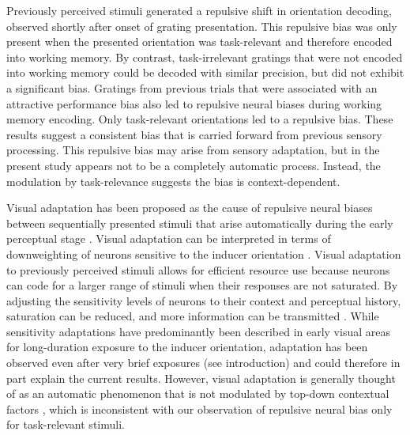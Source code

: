 \documentclass{article}
\begin{document}
\begin{large}
Previously perceived stimuli generated a repulsive shift in orientation decoding, observed shortly after onset of grating presentation. This repulsive bias was only present when the presented orientation was task-relevant and therefore encoded into working memory. By contrast, task-irrelevant gratings that were not encoded into working memory could be decoded with similar precision, but did not exhibit a significant bias. Gratings from previous trials that were associated with an attractive performance bias also led to repulsive neural biases during working memory encoding. Only task-relevant orientations led to a repulsive bias. These results suggest a consistent bias that is carried forward from previous sensory processing. This repulsive bias may arise from sensory adaptation, but in the present study appears not to be a completely automatic process. Instead, the modulation by task-relevance suggests the bias is context-dependent. 

Visual adaptation has been proposed as the cause of repulsive neural biases between sequentially presented stimuli that arise automatically during the early perceptual stage \parencite{Jazayeri2006, Jazayeri2007, Stocker2008, Webster2015, Kohn2007} . Visual adaptation can be interpreted in terms of downweighting of neurons sensitive to the inducer orientation \parencite{Clifford2000, Wainwright1999}. Visual adaptation to previously perceived stimuli allows for efficient resource use \parencite{Stocker2008, Webster2015} because neurons can code for a larger range of stimuli when their responses are not saturated. By adjusting the sensitivity levels of neurons to their context and perceptual history, saturation can be reduced, and more information can be transmitted \parencite{Webster2015}. While sensitivity adaptations have predominantly been described in early visual areas for long-duration exposure to the inducer orientation, adaptation has been observed even after very brief exposures (see introduction) and could therefore in part explain the current results. However, visual adaptation is generally thought of as an automatic phenomenon that is not modulated by top-down contextual factors \parencite{Webster2015, Kohn2007}, which is inconsistent with our observation of repulsive neural bias only for task-relevant stimuli.


\end{large}
\end{document}
